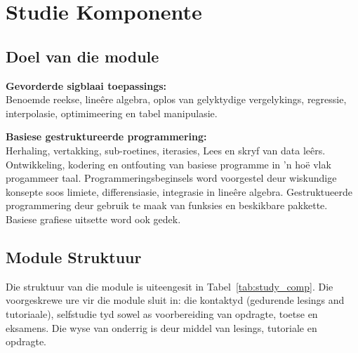 \section{Studie Komponente}
    \subsection{Doel van die module}
        {\bf Gevorderde sigblaai toepassings:} \\
        Benoemde reekse, line\^{e}re algebra, oplos van gelyktydige
        vergelykings, regressie, interpolasie, optimimeering en tabel
        manipulasie.

        \noindent
        {\bf Basiese gestruktureerde programmering:} \\
        Herhaling, vertakking, sub-roetines, iterasies, Lees en skryf van data
        le\^{e}rs.  Ontwikkeling, kodering en ontfouting van basiese programme
        in 'n ho\"{e} vlak progammeer taal. Programmeringsbeginsels word
        voorgestel deur wiskundige konsepte soos limiete, differensiasie,
        integrasie in line\^{e}re algebra.  Gestruktueerde programmering deur
        gebruik te maak van funksies en beskikbare pakkette.  Basiese grafiese
        uitsette word ook gedek.

    \subsection{Module Struktuur}
        Die struktuur van die module is uiteengesit in
        Tabel~\ref{tab:study_comp}. Die voorgeskrewe ure vir die module sluit
        in: die kontaktyd (gedurende lesings and tutoriaale), selfstudie tyd
        sowel as voorbereiding van opdragte, toetse en eksamens. Die wyse van
        onderrig is deur middel van lesings, tutoriale en opdragte.

